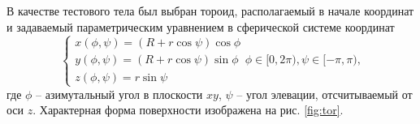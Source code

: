 В качестве тестового тела был выбран тороид, располагаемый в
начале координат и задаваемый параметрическим уравнением в сферической системе
координат
\begin{equation}
    \label{eq:tor}
    \begin{cases}
        x(\phi, \psi) = (R + r\cos \psi) \cos \phi \\
        y(\phi, \psi) = (R + r\cos \psi) \sin \phi \\
        z(\phi, \psi) = r\sin \psi
    \end{cases}
    \phi \in [0, 2\pi), \psi \in [-\pi, \pi),
\end{equation}
где $\phi$ -- азимутальный угол в плоскости  $xy$,  $\psi$ -- угол элевации,
отсчитываемый от оси $z$. Характерная форма поверхности изображена на рис. \ref{fig:tor}.

